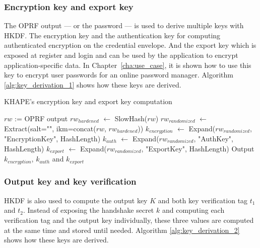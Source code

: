 ﻿\documentclass[../report.tex]{subfiles}
\begin{document}
\subsubsection{Encryption key and export key} \label{sec:encryption_key}
The OPRF output --- or the password --- is used to derive multiple keys with HKDF. The encryption key and the authentication key for computing authenticated encryption on the credential envelope. And the export key which is exposed at register and login and can be used by the application to encrypt application-specific data. In Chapter~\ref{cha:use_case}, it is shown how to use this key to encrypt user passwords for an online password manager.
Algorithm \ref{alg:key_derivation_1} shows how these keys are derived.


\begin{algorithm}
\caption{KHAPE's encryption key and export key computation}
\label{alg:key_derivation_1}
\begin{algorithmic}
\Require $rw$ := OPRF output
\State $rw_{hardened}$ $\gets$ SlowHash($rw$)
\State $rw_{randomized}$ $\gets$ Extract(salt="", ikm=concat($rw$, $rw_{hardened}$))
\State $k_{encryption}$ $\gets$ Expand($rw_{randomized}$, "EncryptionKey", HashLength)
\State $k_{auth}$ $\gets$ Expand($rw_{randomized}$, "AuthKey", HashLength)
\State $k_{export}$ $\gets$ Expand($rw_{randomized}$, "ExportKey", HashLength)
\State Output $k_{encryption}$, $k_{auth}$ and $k_{export}$
\end{algorithmic}
\end{algorithm}


% 
% 


\subsubsection{Output key and key verification}
HKDF is also used to compute the output key $K$ and both key verification tag $t_1$ and $t_2$.
Instead of exposing the handshake secret $k$ and computing each verification tag and the output key individually, these three values are computed at the same time and stored until needed.
Algorithm \ref{alg:key_derivation_2} shows how these keys are derived.
\end{document}
